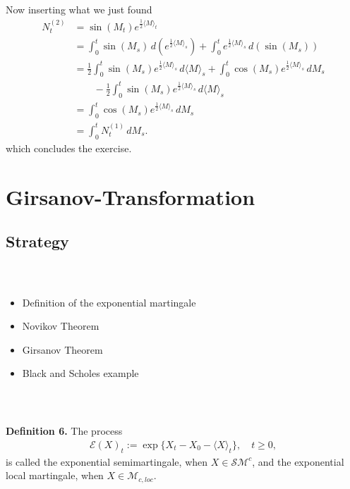 \documentclass{beamer}
\numberwithin{equation}{section}
\newenvironment{frame2}{\begin{frame}\frametitle{{\normalsize \secname} \\ {\large \subsecname}}}{\end{frame}}
\begin{document}
\begin{frame2}
    Now inserting what we just found
    \begin{align*}
        N_t^{(2)} &= \sin(M_t)e^{\frac{1}{2}\langle M \rangle_t} \\
       &= \int_0^t \sin(M_s) \, d\left(e^{\frac{1}{2}\langle M \rangle_s}\right) + \int_0^t e^{\frac{1}{2}\langle M \rangle_s} \, d \left(\sin(M_s)\right) \\
       &= \frac{1}{2}\int_0^t\sin(M_s)e^{\frac{1}{2}\langle M \rangle_s}\, d\langle M \rangle_s + \int_0^t\cos(M_s)e^{\frac{1}{2}\langle M \rangle_s}\, dM_s \\
       &\qquad - \frac{1}{2}\int_0^t\sin(M_s)e^{\frac{1}{2}\langle M \rangle_s}\, d\langle M \rangle_s \\
       &= \int_0^t\cos(M_s)e^{\frac{1}{2}\langle M \rangle_s}\, dM_s \\
       &= \int_0^tN_t^{(1)} \, dM_s.
   \end{align*}
   which concludes the exercise.
\end{frame2}

\section{Girsanov-Transformation}

\subsection{Strategy}
\begin{frame2}
    \begin{itemize}
        \item Definition of the exponential martingale
        \item Novikov Theorem
        \item Girsanov Theorem
        \item Black and Scholes example
    \end{itemize}
\end{frame2}

\begin{frame2}
    \textbf{Definition 6.}
    The process
    \begin{align*}
        \mathcal{E}(X)_t:=\exp\{X_t-X_0-\langle X \rangle_t\}, \quad t\geq 0,
    \end{align*}
    is called the exponential semimartingale, when $X\in\mathcal{S}\mathcal{M}^c$, and the exponential local martingale, when $X\in\mathcal{M}_{c,loc}$.
\end{frame2}
\end{document}
